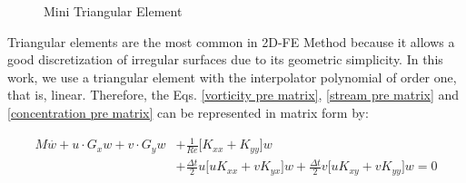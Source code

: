 \begin{figure}[H]
\begin{center}
\end{center}
\caption{Mini Triangular Element}
\label{elemento triangular mini}
\end{figure}






\medskip
Triangular elements are the most common in 2D-FE Method because 
it allows a good discretization of irregular surfaces 
due to its geometric simplicity. In this work, we use a triangular 
element with the interpolator polynomial of order one, that is, linear.
Therefore, 
the Eqs. \ref{vorticity pre matrix}, 
\ref{stream pre matrix} and 
\ref{concentration pre matrix}
can be represented in matrix form by:

\begin{equation}
\begin{aligned}
 M \overset{.}{w} + u \cdot G_x w  + v \cdot G_y w & + \frac{1}{\textit{Re}} \Big[ K_{xx} + K_{yy} \Big] w
 \\[5pt]
 & + \frac{\Delta t}{2} u \Big[ u K_{xx} + v K_{yx} \Big] w 
 + \frac{\Delta t}{2} v \Big[ u K_{xy} + v K_{yy} \Big] w 
 = 0 \label{vorticity matrix}
\end{aligned}
\end{equation}

